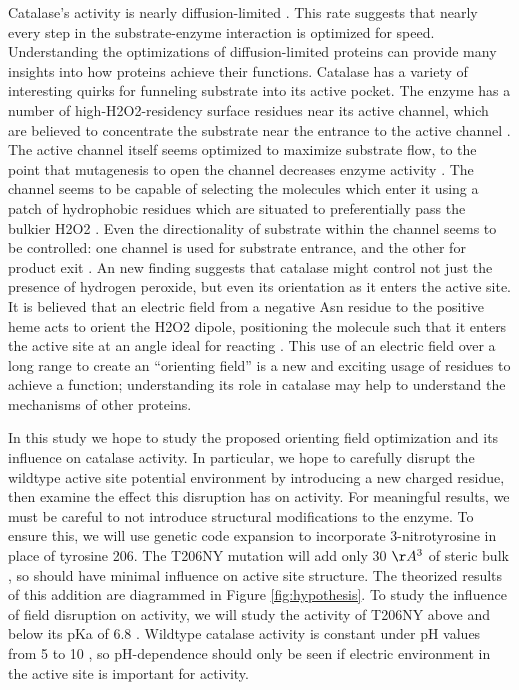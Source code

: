 \documentclass[journal=jacsat,manuscript=article]{achemso}
\begin{document}
Catalase's activity is nearly diffusion-limited \cite{kcatkm, difflimit}. This rate suggests that nearly every step in the substrate-enzyme interaction is optimized for speed. Understanding the optimizations of diffusion-limited proteins can provide many insights into how proteins achieve their functions. Catalase has a variety of interesting quirks for funneling substrate into its active pocket. The enzyme has a number of high-H2O2-residency surface residues near its active channel, which are believed to concentrate the substrate near the entrance to the active channel \cite{concentrateh2o2}. The active channel itself seems optimized to maximize substrate flow, to the point that mutagenesis to open the channel decreases enzyme activity \cite{substrateflow}. The channel seems to be capable of selecting the molecules which enter it using a patch of hydrophobic residues which are situated to preferentially pass the bulkier H2O2 \cite{molecularruler}. Even the directionality of substrate within the channel seems to be controlled: one channel is used for substrate entrance, and the other for product exit \cite{lateralchannel}. An new finding suggests that catalase might control not just the presence of hydrogen peroxide, but even its orientation as it enters the active site. It is believed that an electric field from a negative Asn residue to the positive heme acts to orient the H2O2 dipole, positioning the molecule such that it enters the active site at an angle ideal for reacting \cite{electricpotential}. This use of an electric field over a long range to create an ``orienting field'' is a new and exciting usage of residues to achieve a function; understanding its role in catalase may help to understand the mechanisms of other proteins.

In this study we hope to study the proposed orienting field optimization and its influence on catalase activity. In particular, we hope to carefully disrupt the wildtype active site potential environment by introducing a new charged residue, then examine the effect this disruption has on activity. For meaningful results, we must be careful to not introduce structural modifications to the enzyme. To ensure this, we will use genetic code expansion to incorporate 3-nitrotyrosine in place of tyrosine 206. The T206NY mutation will add only 30 $\AA^3$ of steric bulk \cite{3ntsize}, so should have minimal influence on active site structure. The theorized results of this addition are diagrammed in Figure \ref{fig:hypothesis}. To study the influence of field disruption on activity, we will study the activity of T206NY above and below its pKa of 6.8 \cite{3ntsize}. Wildtype catalase activity is constant under pH values from 5 to 10 \cite{phdependence,kcatkm}, so pH-dependence should only be seen if electric environment in the active site is important for activity.\\
\end{document}
